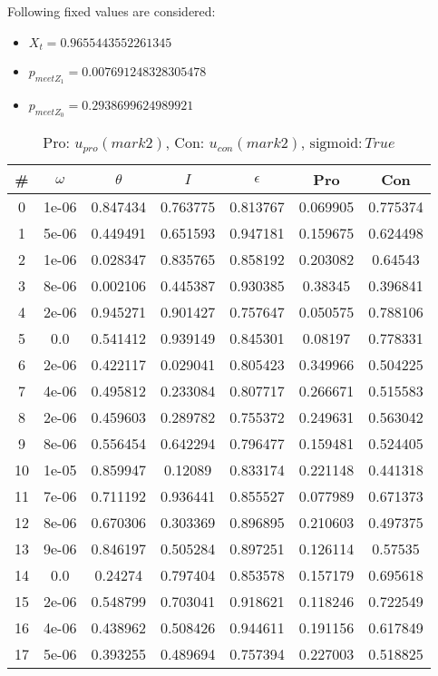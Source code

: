 Following fixed values are considered:
\begin{itemize}
\item $X_t = 0.9655443552261345$
\item $p_{meetZ_1} = 0.007691248328305478$
\item $p_{meetZ_0} = 0.2938699624989921$
\end{itemize}
\begin{table}
\caption{Pro: $u_{pro} (mark 2)$, Con: $u_{con} (mark 2)$, $\mathrm{sigmoid}: True$}
\begin{tabular*}{\linewidth}{c|c|c|c|c|c|c}
\# & $\omega$ & $\theta$ & $I$ & $\epsilon$ & Pro & Con \\
\hline
0 & 1e-06 & 0.847434 & 0.763775 & 0.813767 & 0.069905 & 0.775374\\
1 & 5e-06 & 0.449491 & 0.651593 & 0.947181 & 0.159675 & 0.624498\\
2 & 1e-06 & 0.028347 & 0.835765 & 0.858192 & 0.203082 & 0.64543\\
3 & 8e-06 & 0.002106 & 0.445387 & 0.930385 & 0.38345 & 0.396841\\
4 & 2e-06 & 0.945271 & 0.901427 & 0.757647 & 0.050575 & 0.788106\\
5 & 0.0 & 0.541412 & 0.939149 & 0.845301 & 0.08197 & 0.778331\\
6 & 2e-06 & 0.422117 & 0.029041 & 0.805423 & 0.349966 & 0.504225\\
7 & 4e-06 & 0.495812 & 0.233084 & 0.807717 & 0.266671 & 0.515583\\
8 & 2e-06 & 0.459603 & 0.289782 & 0.755372 & 0.249631 & 0.563042\\
9 & 8e-06 & 0.556454 & 0.642294 & 0.796477 & 0.159481 & 0.524405\\
10 & 1e-05 & 0.859947 & 0.12089 & 0.833174 & 0.221148 & 0.441318\\
11 & 7e-06 & 0.711192 & 0.936441 & 0.855527 & 0.077989 & 0.671373\\
12 & 8e-06 & 0.670306 & 0.303369 & 0.896895 & 0.210603 & 0.497375\\
13 & 9e-06 & 0.846197 & 0.505284 & 0.897251 & 0.126114 & 0.57535\\
14 & 0.0 & 0.24274 & 0.797404 & 0.853578 & 0.157179 & 0.695618\\
15 & 2e-06 & 0.548799 & 0.703041 & 0.918621 & 0.118246 & 0.722549\\
16 & 4e-06 & 0.438962 & 0.508426 & 0.944611 & 0.191156 & 0.617849\\
17 & 5e-06 & 0.393255 & 0.489694 & 0.757394 & 0.227003 & 0.518825\\

\end{tabular*}
\end{table}
